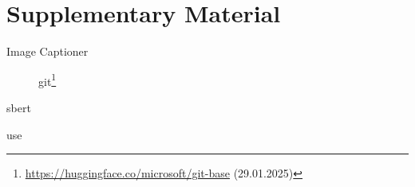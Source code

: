 \appendix
\section{Supplementary Material}

\begin{frame}{Image Captioner~\cite{git_2022}}
    \label{supp:img_cap}
    \begin{figure}
        
        \caption{\ac{git}\footnote{\url{https://huggingface.co/microsoft/git-base} (29.01.2025)}}
    \end{figure}
\end{frame}

\begin{frame}{\ac{sbert}~\cite{sbert_2019}}
    \label{supp:sbert}
    
\end{frame}

\begin{frame}{\ac{use}~\cite{use_2019}}
    \label{supp:use}
    
\end{frame}